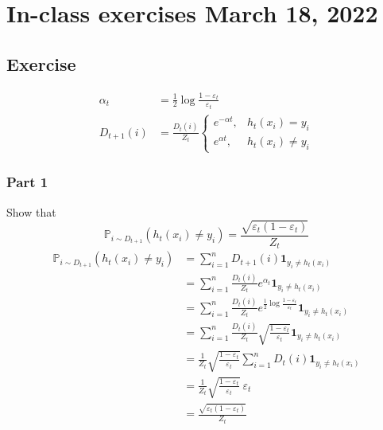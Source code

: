 \documentclass{article}
\newcommand{\1}{\mathbf{1}}
\renewcommand{\P}{\mathbb{P}}
\begin{document}
\section{In-class exercises March 18, 2022}
\subsection{Exercise}
\begin{align*}
  \alpha_t    & = \frac{1}{2} \log\frac{1 - \varepsilon_t}{\varepsilon_t} \\
  D_{t+1} (i) & =
  \frac{D_t (i)}{Z_t}
  \begin{cases}
    e^{-\alpha t}, & h_t (x_i) = y_i    \\
    e^{\alpha t},  & h_t (x_i) \neq y_i
  \end{cases}
\end{align*}
\subsubsection{Part 1}
Show that
\[
  \P_{i \sim D_{t+1}} \left(h_t (x_i) \neq y_i\right) = \frac{\sqrt{\varepsilon_t (1 - \varepsilon_t)}}{Z_t}
\]
\begin{align*}
  \P_{i \sim D_{t+1}} \left(h_t (x_i) \neq y_i\right)
   & = \sum_{i=1}^n D_{t+1} (i) \1_{y_i \neq h_{t} (x_i)}                                                                           \\
   & = \sum_{i=1}^n \frac{D_t (i)}{Z_t} e^{\alpha_t} \1_{y_i \neq h_{t} (x_i)}                                                  \\
   & = \sum_{i=1}^n \frac{D_t (i)}{Z_t} e^{\frac{1}{2} \log\frac{1 - \varepsilon_t}{\varepsilon_t}} \1_{y_i \neq h_{t} (x_i)} \\
   & = \sum_{i=1}^n \frac{D_t (i)}{Z_t} \sqrt{\frac{1 - \varepsilon_t}{\varepsilon_t}} \1_{y_i \neq h_{t} (x_i)} \\
   & = \frac{1}{Z_t} \sqrt{\frac{1 - \varepsilon_t}{\varepsilon_t}} \sum_{i=1}^n D_t (i) \1_{y_i \neq h_{t} (x_i)} \\
   & = \frac{1}{Z_t} \sqrt{\frac{1 - \varepsilon_t}{\varepsilon_t}} \ \varepsilon_t \\
   & = \frac{\sqrt{\varepsilon_t (1 - \varepsilon_t)}}{Z_t}
\end{align*}
\end{document}
